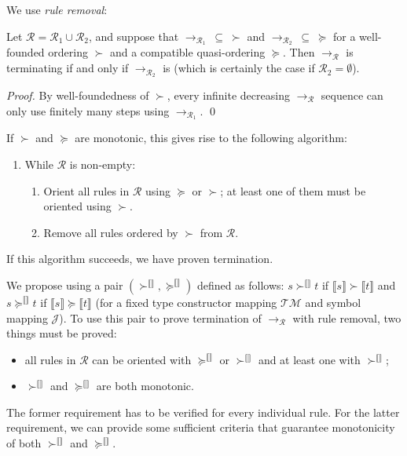 \documentclass[runningheads,a4paper]{llncs}
\newcommand{\Rules}{\mathcal{R}}
\newcommand{\Typemap}{\mathcal{T\!M}}
\newcommand{\Termmap}{\mathcal{J}}
\newcommand{\succinterpret}{\succ^{\llbracket\rrbracket}}
\newcommand{\succeqinterpret}{\succeq^{\llbracket\rrbracket}}
\newcommand{\interpret}[1]{\llbracket #1 \rrbracket}
\newcommand{\arr}[1]{\longrightarrow_{#1}}
\begin{document}
We use \emph{rule removal}:

\begin{theorem}\label{thm:ruleremove}
Let $\Rules = \Rules_1 \cup \Rules_2$, and suppose that
$\arr{\Rules_1}\: \subseteq\:\succ$ and
$\arr{\Rules_2}\:\subseteq\:\succeq$ for a well-founded ordering
$\succ$ and a compatible quasi-ordering $\succeq$.  Then
$\arr{\Rules}$ is terminating if and only if $\arr{\Rules_2}$ is
(which is certainly the case if $\Rules_2 = \emptyset$).
\end{theorem}

\begin{proof}
By well-foundedness of $\succ$, every infinite decreasing $\arr{\Rules}$
sequence can only use finitely many steps using $\arr{\Rules_1}$.
\qed
\end{proof}

If $\succ$ and $\succeq$ are monotonic, this gives rise to the
following algorithm:
\begin{enumerate}
\item While $\Rules$ is non-empty:
  \begin{enumerate}
  \item Orient all rules in $\Rules$ using $\succeq$ or $\succ$; at least
    one of them must be oriented using $\succ$.
  \item Remove all rules ordered by $\succ$ from $\Rules$.
  \end{enumerate}
\end{enumerate}
If this algorithm succeeds, we have proven termination.

We propose using a pair $(\succinterpret,\succeqinterpret)$ defined as
follows: $s \succinterpret t$ if $\interpret{s} \succ \interpret{t}$ and
$s \succeqinterpret t$ if $\interpret{s} \succeq \interpret{t}$ (for a
fixed type constructor mapping $\Typemap$ and symbol mapping $\Termmap$).
To use this pair to prove termination of $\arr{\Rules}$ with rule removal,
two things must be proved:

\begin{itemize}
\item all rules in $\Rules$ can be oriented with $\succeqinterpret$ or
  $\succinterpret$ and at least one with $\succinterpret$;
\item $\succinterpret$ and $\succeqinterpret$ are both monotonic.
\end{itemize}

The former requirement has to be verified for every individual rule.
For the latter requirement, we can provide some sufficient criteria that
guarantee monotonicity of both $\succinterpret$ and $\succeqinterpret$.
\end{document}
